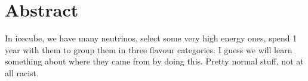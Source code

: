 \chapter{Abstract}
In icecube, we have many neutrinos, select some very high energy ones, 
spend 1 year with them to group them in three flavour categories. I guess we will learn something about where they came from by doing this.
Pretty normal stuff, not at all racist. 
